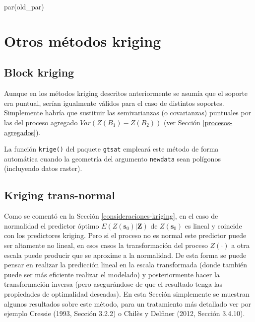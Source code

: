 \documentclass[
  spanish,
]{book}
\newenvironment{Shaded}{\begin{snugshade}}{\end{snugshade}}
\newcommand{\FunctionTok}[1]{\textcolor[rgb]{0.00,0.00,0.00}{#1}}
\newcommand{\NormalTok}[1]{#1}
\theoremstyle{break}
\theoremstyle{definition}
\theoremstyle{definition}
\theoremstyle{definition}
\theoremstyle{definition}
\theoremstyle{remark}
\begin{document}
\begin{Shaded}
\begin{Highlighting}[]
\FunctionTok{par}\NormalTok{(old\_par)}
\end{Highlighting}
\end{Shaded}

\hypertarget{otros-muxe9todos-kriging}{%
\section{Otros métodos kriging}\label{otros-muxe9todos-kriging}}

\hypertarget{block-kriging}{%
\subsection{Block kriging}\label{block-kriging}}

Aunque en los métodos kriging descritos anteriormente se asumía que el soporte era puntual, serían igualmente válidos para el caso de distintos soportes.
Simplemente habría que sustituir las semivarianzas (o covarianzas) puntuales por las del proceso agregado \(Var\left( Z(B_1)-Z(B_2)\right)\) (ver Sección \ref{procesos-agregados}).

La función \texttt{krige()} del paquete \texttt{gtsat} empleará este método de forma automática cuando la geometría del argumento \texttt{newdata} sean polígonos (incluyendo datos raster).

\hypertarget{kriging-trans-normal}{%
\subsection{Kriging trans-normal}\label{kriging-trans-normal}}

Como se comentó en la Sección \ref{consideraciones-kriging}, en el caso de normalidad el predictor óptimo \(E\left( \left. Z(\mathbf{s}_{0})\right| \mathbf{Z}\right)\) de \(Z(\mathbf{s}_{0})\) es lineal y coincide con los predictores kriging.
Pero si el proceso no es normal este predictor puede ser altamente no lineal, en esos casos la transformación del proceso \(Z(\cdot)\) a otra escala puede producir que se aproxime a la normalidad.
De esta forma se puede pensar en realizar la predicción lineal en la escala transformada (donde también puede ser más eficiente realizar el modelado) y posteriormente hacer la transformación inversa (pero asegurándose de que el resultado tenga las propiedades de optimalidad deseadas).
En esta Sección simplemente se muestran algunos resultados sobre este método, para un tratamiento más detallado ver por ejemplo Cressie (1993, Sección 3.2.2) o Chilès y Delfiner (2012, Sección 3.4.10).
\end{document}
